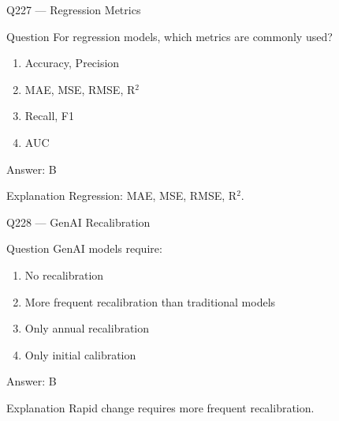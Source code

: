 \documentclass[aspectratio=169,8pt]{beamer}
\begin{document}
								\begin{frame}{Q227 --- Regression Metrics}
									\begin{block}{Question}
										For regression models, which metrics are commonly used?
										\begin{enumerate}
											\item Accuracy, Precision
											\item MAE, MSE, RMSE, R$^2$
											\item Recall, F1
											\item AUC
										\end{enumerate}
									\end{block}
									\begin{exampleblock}{Answer: B}\end{exampleblock}
									\begin{block}{Explanation}
										Regression: MAE, MSE, RMSE, R$^2$.
									\end{block}
								\end{frame}
								
								\begin{frame}{Q228 --- GenAI Recalibration}
									\begin{block}{Question}
										GenAI models require:
										\begin{enumerate}
											\item No recalibration
											\item More frequent recalibration than traditional models
											\item Only annual recalibration
											\item Only initial calibration
										\end{enumerate}
									\end{block}
									\begin{exampleblock}{Answer: B}\end{exampleblock}
									\begin{block}{Explanation}
										Rapid change requires more frequent recalibration.
									\end{block}
								\end{frame}
								
\end{document}
